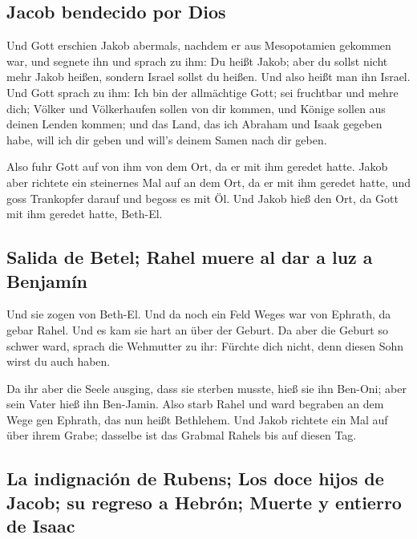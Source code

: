 \hypertarget{jacob-bendecido-por-dios}{%
\subsection{Jacob bendecido por Dios}\label{jacob-bendecido-por-dios}}

 Und Gott erschien Jakob abermals, nachdem er aus
Mesopotamien gekommen war, und segnete ihn  und sprach zu
ihm: Du heißt Jakob; aber du sollst nicht mehr Jakob heißen, sondern
Israel sollst du heißen. Und also heißt man ihn Israel. 
Und Gott sprach zu ihm: Ich bin der allmächtige Gott; sei fruchtbar und
mehre dich; Völker und Völkerhaufen sollen von dir kommen, und Könige
sollen aus deinen Lenden kommen;  und das Land, das ich
Abraham und Isaak gegeben habe, will ich dir geben und will's deinem
Samen nach dir geben.

 Also fuhr Gott auf von ihm von dem Ort, da er mit ihm
geredet hatte.  Jakob aber richtete ein steinernes Mal
auf an dem Ort, da er mit ihm geredet hatte, und goss Trankopfer darauf
und begoss es mit Öl.  Und Jakob hieß den Ort, da Gott
mit ihm geredet hatte, Beth-El.

\hypertarget{salida-de-betel-rahel-muere-al-dar-a-luz-a-benjamuxedn}{%
\subsection{Salida de Betel; Rahel muere al dar a luz a
Benjamín}\label{salida-de-betel-rahel-muere-al-dar-a-luz-a-benjamuxedn}}

 Und sie zogen von Beth-El. Und da noch ein Feld Weges
war von Ephrath, da gebar Rahel.  Und es kam sie hart an
über der Geburt. Da aber die Geburt so schwer ward, sprach die Wehmutter
zu ihr: Fürchte dich nicht, denn diesen Sohn wirst du auch haben.

 Da ihr aber die Seele ausging, dass sie sterben musste,
hieß sie ihn Ben-Oni; aber sein Vater hieß ihn Ben-Jamin.
 Also starb Rahel und ward begraben an dem Wege gen
Ephrath, das nun heißt Bethlehem.  Und Jakob richtete ein
Mal auf über ihrem Grabe; dasselbe ist das Grabmal Rahels bis auf diesen
Tag.

\hypertarget{la-indignaciuxf3n-de-rubens-los-doce-hijos-de-jacob-su-regreso-a-hebruxf3n-muerte-y-entierro-de-isaac}{%
\subsection{La indignación de Rubens; Los doce hijos de Jacob; su
regreso a Hebrón; Muerte y entierro de
Isaac}\label{la-indignaciuxf3n-de-rubens-los-doce-hijos-de-jacob-su-regreso-a-hebruxf3n-muerte-y-entierro-de-isaac}}

